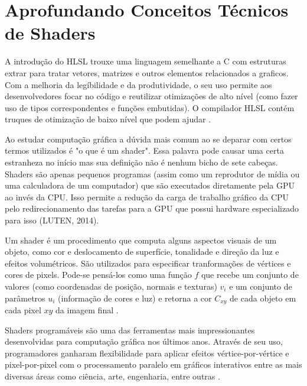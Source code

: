 \section{Aprofundando Conceitos Técnicos de Shaders}
\label{sec:aprofundando-conceitos-tecnicos-shaders}

A introdução do HLSL trouxe uma linguagem semelhante a C com estruturas extrar para tratar vetores, matrizes e outros elementos relacionados a graficos. Com a melhoria da legíbilidade e da produtividade, o seu uso permite aos desenvolvedores focar no código e reutilizar otimizações de alto nível (como fazer uso de tipos correspondentes e funções embutidas). O compilador HLSL contém truques de otimização de baixo nível que podem ajudar \cite{riguer2002performance}.

Ao estudar computação gráfica a dúvida mais comum ao se deparar com certos termos utilizados é "o que é um shader". Essa palavra pode causar uma certa estranheza no início mas sua definição não é nenhum bicho de sete cabeças. Shaders são apenas pequenos programas (assim como um reprodutor de mídia ou uma calculadora de um computador) que são executados diretamente pela \acrshort{GPU} ao invés da \acrshort{CPU}. Isso permite a redução da carga de trabalho gráfico da \acrshort{CPU} pelo redirecionamento das tarefas para a \acrshort{GPU} que possui hardware especializado para isso (LUTEN, 2014)\nocite{openGLBook}.

Um shader é um procedimento que computa alguns aspectos visuais de um objeto, como cor e deslocamento de superfície, tonalidade e direção da luz e efeitos volumétricos. São utilizados para especificar tranformações de vértices e cores de pixels. Pode-se pensá-los como uma função $ f $ que recebe um conjunto de valores (como coordenadas de posição, normais e texturas) $ v_i $ e um conjunto de parâmetros $ u_i $ (informação de cores e luz) e retorna a cor $ C_{xy} $ de cada objeto em cada pixel $ xy $ da imagem final \cite{fabio2005user}. 

Shaders programáveis são uma das ferramentas mais impressionantes desenvolvidas para computação gráfica nos últimos anos. Através de seu uso, programadores ganharam flexibilidade para aplicar efeitos vértice-por-vértice e pixel-por-pixel com o processamento paralelo em gráficos interativos entre as mais diversas áreas como ciência, arte, engenharia, entre outras \cite{bailey2007}.

